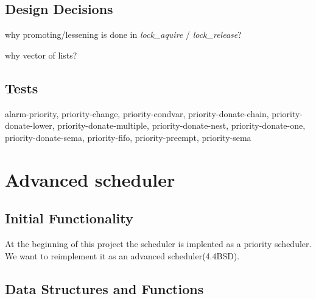 

    \subsection{Design Decisions}

	why promoting/lessening is done in \textit{lock\_aquire} / \textit{lock\_release}?
	
	why vector of lists?

    \subsection{Tests}

	alarm-priority, priority-change, priority-condvar, priority-donate-chain, priority-donate-lower, priority-donate-multiple, priority-donate-nest, priority-donate-one, priority-donate-sema, priority-fifo, priority-preempt, priority-sema

\section{Advanced scheduler}

    \subsection{Initial Functionality}

	At the beginning of this project the scheduler is implented as a priority scheduler. We want to reimplement it as an advanced scheduler(4.4BSD).

    \subsection{Data Structures and Functions}

